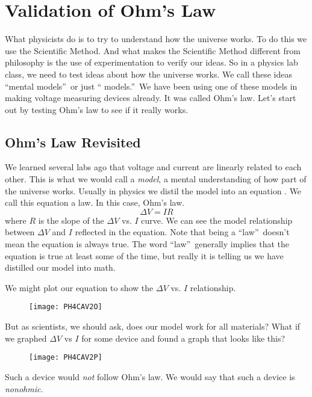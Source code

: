 \chapter{Validation of Ohm's Law}
What physicists do is to try to understand how the universe works. To do
this we use the Scientific Method. And what makes the Scientific Method
different from philosophy is the use of experimentation to verify our ideas.
So in a physics lab class, we need to test ideas about how the universe
works. We call these ideas \textquotedblleft mental
models\textquotedblright\ or just \textquotedblleft
models.\textquotedblright\ We have been using one of these models in making
voltage measuring devices already. It was called Ohm's law. Let's start out
by testing Ohm's law to see if it really works.

\section{Ohm's Law Revisited}

We learned several labs ago that voltage and current are linearly related to
each other. This is what we would call a \emph{model}, a mental
understanding of how part of the universe works. Usually in physics we
distil the model into an equation . We call this equation a law. In this
case, Ohm's law. 
\begin{equation*}
\Delta V=IR
\end{equation*}%
where $R$ is the slope of the $\Delta V$ vs. $I$ curve. We can see the model
relationship between $\Delta V$ and $I$ reflected in the equation. Note that
being a \textquotedblleft law\textquotedblright\ doesn't mean the equation
is always true. The word \textquotedblleft law\textquotedblright\ generally
implies that the equation is true at least some of the time, but really it
is telling us we have distilled our model into math.

We might plot our equation to show the $\Delta V$ vs. $I$ relationship.

\begin{figure}[h!]
\texttt{[image: PH4CAV2O]}
\end{figure}But as scientists, we should ask,
does our model work for all materials? What if we graphed $\Delta V$ vs $I$
for some device and found a graph that looks like this?\begin{figure}[h!]
\texttt{[image: PH4CAV2P]}
\end{figure}Such a device would \emph{not}
follow Ohm's law. We would say that such a device is \emph{nonohmic}.

